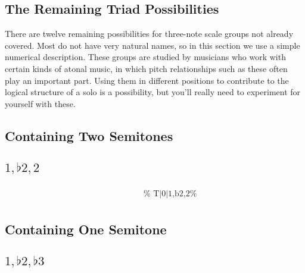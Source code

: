 \documentclass[english]{./gbook}
\begin{document}
\begin{large}
\section{The Remaining Triad Possibilities}

There are twelve remaining possibilities for three-note scale groups not already covered. Most do not have very natural names, so in this section we use a simple numerical description. These groups are studied by musicians who work with certain kinds of atonal music, in which pitch relationships such as these often play an important part. Using them in different positions to contribute to the logical structure of a solo is a possibility, but you'll really need to experiment for yourself with these.

\subsection*{Containing Two Semitones}

\subsection*{$1,\flat2,2$}
\[
\begin{array}{ll}
	\begin{array}{c}
		\begin{array}{ccc}
			&%
			&%
		\end{array}
		\\
		\begin{array}{cc}
			&%
		\end{array}
	\end{array}

&
	\text{
	}
\end{array}
\]


\subsection*{Containing One Semitone}


\subsection*{$1,\flat2,\flat3$}
\[
\begin{array}{ll}
	\begin{array}{c}
		\begin{array}{ccc}
			&%
			&%
		\end{array}
		\\
		\begin{array}{cc}
			&%
		\end{array}
	\end{array}


\end{array}\]
\end{large}
\end{document}
